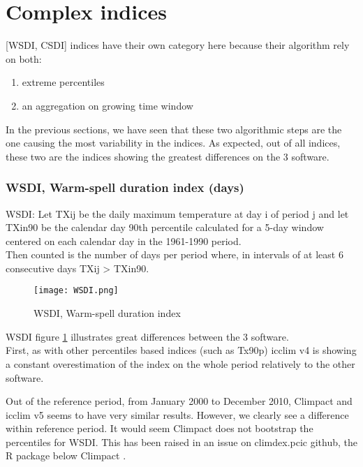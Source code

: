 \documentclass[a4paper,11pt]{article}
\begin{document}
\part{Complex indices}
\label{part/complex_indices}
    [WSDI, CSDI] indices have their own category here because their algorithm rely on both:
    \begin{enumerate}
        \item extreme percentiles
        \item an aggregation on growing time window
    \end{enumerate}
    In the previous sections, we have seen that these two algorithmic steps are the one causing the most variability in the indices.
    As expected, out of all indices, these two are the indices showing the greatest differences on the 3 software.

    \section{WSDI, Warm-spell duration index (days)}
        WSDI: Let TXij be the daily maximum temperature at day i of period j and let TXin90 be the calendar day 90th percentile calculated for a 5-day window centered on each calendar day in the 1961-1990 period.\\
        Then counted is the number of days per period where, in intervals of at least 6 consecutive days TXij > TXin90.

        \begin{figure}[h]
            \centering
            \texttt{[image: WSDI.png]}
            \caption{WSDI, Warm-spell duration index}
            \label{figure/wsdi}
        \end{figure}
        
        WSDI figure \ref{figure/wsdi} illustrates great differences between the 3 software.
        \\
        First, as with other percentiles based indices (such as Tx90p) icclim v4 is showing a constant overestimation of the index on the whole period relatively to the other software.

        Out of the reference period, from January 2000 to December 2010, Climpact and icclim v5 seems to have very similar results.
        However, we clearly see a difference within reference period. It would seem Climpact does not bootstrap the percentiles for WSDI.
        This has been raised in an issue on climdex.pcic github, the R package below Climpact \cite{gh/wsdi_issue}.
    
\end{document}
